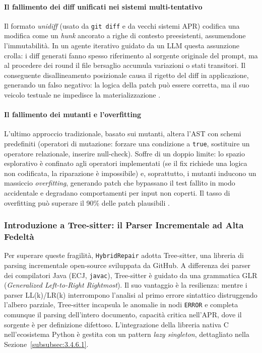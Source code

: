 \paragraph{Il fallimento dei diff unificati nei sistemi multi-tentativo}
Il formato \textit{unidiff} (usato da \texttt{git diff} e da vecchi sistemi APR) codifica una modifica come un
\textit{hunk} ancorato a righe di contesto preesistenti, assumendone l'immutabilità. In un agente iterativo guidato
da un LLM questa assunzione crolla: i diff generati fanno spesso riferimento al sorgente originale del prompt, ma al
procedere dei round il file bersaglio accumula variazioni o stati transitori. Il conseguente disallineamento
posizionale causa il rigetto del diff in applicazione, generando un falso negativo: la logica della patch può essere
corretta, ma il suo veicolo testuale ne impedisce la materializzazione \cite{jimenez2024sweagent, xia2023chatrepair}.

\paragraph{Il fallimento dei mutanti e l'overfitting}
L'ultimo approccio tradizionale, basato sui mutanti, altera l'AST con schemi predefiniti (operatori di mutazione:
forzare una condizione a \texttt{true}, sostituire un operatore relazionale, inserire null-check). Soffre di un
doppio limite: lo spazio esplorativo è confinato agli operatori implementati (se il fix richiede una logica non
codificata, la riparazione è impossibile) e, soprattutto, i mutanti inducono un massiccio \textit{overfitting},
generando patch che bypassano il test fallito in modo accidentale e degradano comportamenti per input non coperti.
Il tasso di overfitting può superare il 90\% delle patch plausibili \cite{qi2015analysis, huang2024evolving}.

\subsubsection{Introduzione a Tree-sitter: il Parser Incrementale ad Alta Fedeltà}
\label{subsubsec:3.4.5.2}
Per superare queste fragilità, \texttt{HybridRepair} adotta Tree-sitter, una libreria di parsing incrementale
open-source sviluppata da GitHub. A differenza dei parser dei compilatori Java (ECJ, \texttt{javac}), Tree-sitter è
guidato da una grammatica GLR (\textit{Generalized Left-to-Right Rightmost}). Il suo vantaggio è la resilienza:
mentre i parser LL(k)/LR(k) interrompono l'analisi al primo errore sintattico distruggendo l'albero parziale,
Tree-sitter incapsula le anomalie in nodi \texttt{ERROR} e completa comunque il parsing dell'intero documento,
capacità critica nell'APR, dove il sorgente è per definizione difettoso. L'integrazione della libreria nativa C
nell'ecosistema Python è gestita con un pattern \textit{lazy singleton}, dettagliato nella
Sezione~\ref{subsubsec:3.4.6.1}.

